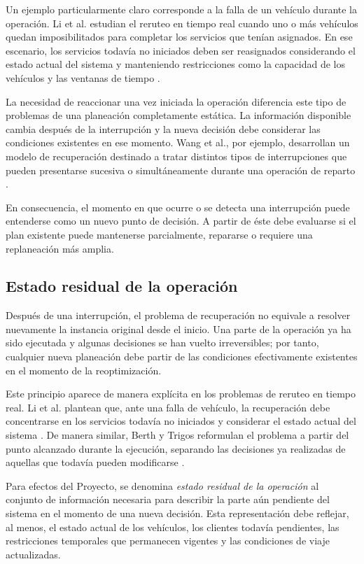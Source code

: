 \documentclass[11pt]{article}
\begin{document}
Un ejemplo particularmente claro corresponde a la falla de un vehículo durante la operación. Li et al. estudian el reruteo en tiempo real cuando uno o más vehículos quedan imposibilitados para completar los servicios que tenían asignados. En ese escenario, los servicios todavía no iniciados deben ser reasignados considerando el estado actual del sistema y manteniendo restricciones como la capacidad de los vehículos y las ventanas de tiempo \parencite{li_mirchandani_borenstein_2009}.

La necesidad de reaccionar una vez iniciada la operación diferencia este tipo de problemas de una planeación completamente estática. La información disponible cambia después de la interrupción y la nueva decisión debe considerar las condiciones existentes en ese momento. Wang et al., por ejemplo, desarrollan un modelo de recuperación destinado a tratar distintos tipos de interrupciones que pueden presentarse sucesiva o simultáneamente durante una operación de reparto \parencite{wang_ruan_shi_2012}.

En consecuencia, el momento en que ocurre o se detecta una interrupción puede entenderse como un nuevo punto de decisión. A partir de éste debe evaluarse si el plan existente puede mantenerse parcialmente, repararse o requiere una replaneación más amplia.

\subsection{Estado residual de la operación}

Después de una interrupción, el problema de recuperación no equivale a resolver
nuevamente la instancia original desde el inicio. Una parte de la operación ya ha sido
ejecutada y algunas decisiones se han vuelto irreversibles; por tanto, cualquier nueva
planeación debe partir de las condiciones efectivamente existentes en el momento de la
reoptimización.

Este principio aparece de manera explícita en los problemas de reruteo en tiempo real.
Li et al. plantean que, ante una falla de vehículo, la recuperación debe concentrarse en
los servicios todavía no iniciados y considerar el estado actual del sistema
\parencite{li_mirchandani_borenstein_2009}. De manera similar, Berth y Trigos
reformulan el problema a partir del punto alcanzado durante la ejecución, separando
las decisiones ya realizadas de aquellas que todavía pueden modificarse
\parencite{berth_trigos_2025}.

Para efectos del Proyecto, se denomina \textit{estado residual de la operación} al
conjunto de información necesaria para describir la parte aún pendiente del sistema
en el momento de una nueva decisión. Esta representación debe reflejar, al menos, el
estado actual de los vehículos, los clientes todavía pendientes, las restricciones
temporales que permanecen vigentes y las condiciones de viaje actualizadas.
\end{document}
